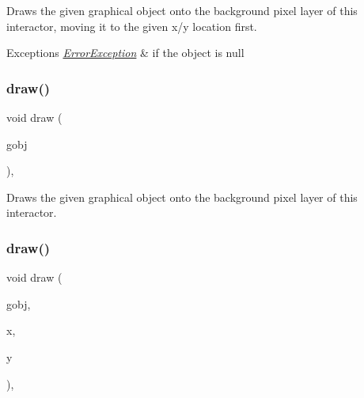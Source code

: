 Draws the given graphical object onto the background pixel layer of this interactor, moving it to the given x/y location first. 


\begin{DoxyExceptions}{Exceptions}
{\em \mbox{\hyperlink{classErrorException}{Error\+Exception}}} & if the object is null \\
\hline
\end{DoxyExceptions}
\mbox{\label{classGDrawingSurface_a022a8d51c7fabcd79a0c809233e93453}} 
\subsubsection{\texorpdfstring{draw()}{draw()}\hspace{0.1cm}{\footnotesize\ttfamily [2/4]}}
{\footnotesize\ttfamily void draw (\begin{DoxyParamCaption}\item[{\mbox{\hyperlink{classGObject}{G\+Object}} \&}]{gobj }\end{DoxyParamCaption})\hspace{0.3cm}{\ttfamily [virtual]}, {\ttfamily [inherited]}}



Draws the given graphical object onto the background pixel layer of this interactor. 

\mbox{\label{classGDrawingSurface_a8af8762bd6720e0a1d2a84b190e3dc96}} 
\subsubsection{\texorpdfstring{draw()}{draw()}\hspace{0.1cm}{\footnotesize\ttfamily [3/4]}}
{\footnotesize\ttfamily void draw (\begin{DoxyParamCaption}\item[{\mbox{\hyperlink{classGObject}{G\+Object}} \&}]{gobj,  }\item[{double}]{x,  }\item[{double}]{y }\end{DoxyParamCaption})\hspace{0.3cm}{\ttfamily [virtual]}, {\ttfamily [inherited]}}



